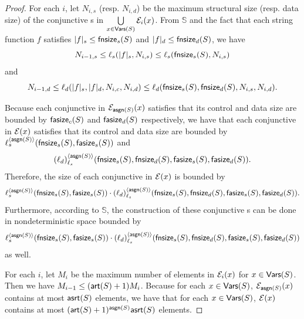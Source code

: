 \begin{proof}

For each $i$, let $N_{i,s}$ (resp. $N_{i, d}$) be the maximum structural size (resp. data size) of the conjunctive \SA{}s in $\bigcup \limits_{x \in \mathsf{Vars}(S)} \mathcal{E}_i(x)$. From $\mathbb{S}$\prerec{} and the fact that each string function $f$ satisfies  $|f|_s \le \mathsf{fnsize}_s(S)$ and $|f|_d \le \mathsf{fnsize}_d(S)$, we have 
%
$$N_{i-1, s} \le \ell_s(|f|_s, N_{i, s}) \le \ell_s(\mathsf{fnsize}_s(S), N_{i,s})$$ 
%
and
%
$$N_{i-1, d} \le \ell_d(|f|_s, |f|_d, N_{i, c}, N_{i,d}) \le \ell_d(\mathsf{fnsize}_s(S), \mathsf{fnsize}_d(S), N_{i, s}, N_{i,d}).$$ 

Because each conjunctive \SA{} in $\mathcal{E}_{\mathsf{asgn}(S)}(x)$ satisfies that its control and data size are bounded by $\mathsf{fasize}_c(S)$ and $\mathsf{fasize}_d(S)$ respectively, 
we have that each conjunctive \SA{} in $\mathcal{E}(x)$ satisfies that its control and data size are bounded by $\ell_s^{\langle \mathsf{asgn}(S) \rangle}(\mathsf{fnsize}_s(S), \mathsf{fasize}_s(S))$ and 
%
\[ (\ell_d)^{\langle  \mathsf{asgn}(S) \rangle}_{\ell_s}(\mathsf{fnsize}_s(S), \mathsf{fnsize}_d(S), \mathsf{fasize}_s(S), \mathsf{fasize}_d(S)).\]
% 
Therefore, the size of each conjunctive \SA{} in $\mathcal{E}(x)$ is bounded by 
{
\small
$$\ell_s^{\langle  \mathsf{asgn}(S) \rangle}(\mathsf{fnsize}_s(S), \mathsf{fasize}_s(S)) \cdot (\ell_d)^{\langle \mathsf{asgn}(S) \rangle}_{\ell_s}(\mathsf{fnsize}_s(S),  \mathsf{fnsize}_d(S), \mathsf{fasize}_s(S), \mathsf{fasize}_d(S)).$$
}
Furthermore, according to $\mathbb{S}$\prerec{}, the construction of these conjunctive \SA{}s can be done in nondeterministic space bounded by 
%
{
\small
$$\ell_s^{\langle  \mathsf{asgn}(S) \rangle}(\mathsf{fnsize}_s(S), \mathsf{fasize}_s(S)) \cdot (\ell_d)^{\langle \mathsf{asgn}(S) \rangle}_{\ell_s}(\mathsf{fnsize}_s(S),  \mathsf{fnsize}_d(S), \mathsf{fasize}_s(S), \mathsf{fasize}_d(S)) $$
}
as well.
%


For each $i$, let $M_i$ be the maximum number of elements in $\mathcal{E}_i(x)$ for $x  \in \mathsf{Vars}(S)$.
Then we have $M_{i-1} \le (\mathsf{art}(S)+1)M_i $. Because for each $x \in \mathsf{Vars}(S)$, $\mathcal{E}_{\mathsf{asgn}(S)}(x)$ contains at most $\mathsf{asrt}(S)$ elements, we have that for each $x \in \mathsf{Vars}(S)$, $\mathcal{E}(x)$ contains at most $(\mathsf{art}(S)+1)^{\mathsf{asgn}(S)}\mathsf{asrt}(S)$ elements. 


\end{proof}
